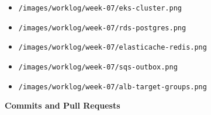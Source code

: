\begin{itemize}
\tightlist
\item
  \texttt{/\allowbreak{}images/\allowbreak{}worklog/\allowbreak{}week-\allowbreak{}07/\allowbreak{}eks-\allowbreak{}cluster.\allowbreak{}png}
\item
  \texttt{/\allowbreak{}images/\allowbreak{}worklog/\allowbreak{}week-\allowbreak{}07/\allowbreak{}rds-\allowbreak{}postgres.\allowbreak{}png}
\item
  \texttt{/\allowbreak{}images/\allowbreak{}worklog/\allowbreak{}week-\allowbreak{}07/\allowbreak{}elasticache-\allowbreak{}redis.\allowbreak{}png}
\item
  \texttt{/\allowbreak{}images/\allowbreak{}worklog/\allowbreak{}week-\allowbreak{}07/\allowbreak{}sqs-\allowbreak{}outbox.\allowbreak{}png}
\item
  \texttt{/\allowbreak{}images/\allowbreak{}worklog/\allowbreak{}week-\allowbreak{}07/\allowbreak{}alb-\allowbreak{}target-\allowbreak{}groups.\allowbreak{}png}
\end{itemize}

\vspace{0.5em}\noindent\textbf{Commits and Pull
Requests}\par

